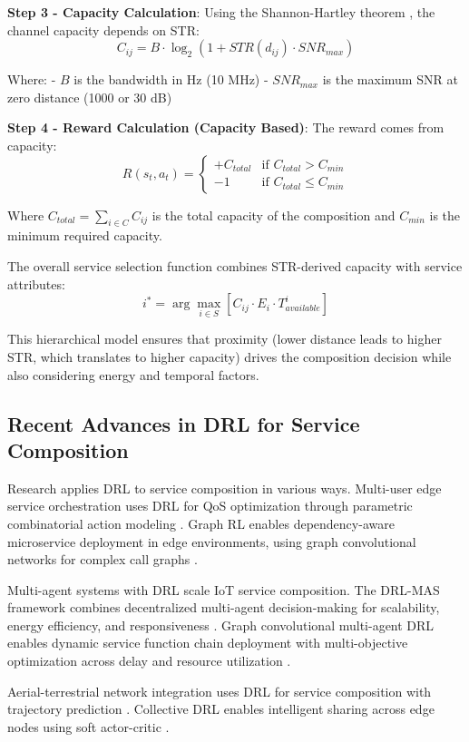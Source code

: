\documentclass[10pt,twocolumn]{article}
\begin{document}
\textbf{Step 3 - Capacity Calculation}: Using the Shannon-Hartley
theorem \nocite{shannon1948}, the channel capacity depends on STR:
\[C_{ij} = B \cdot \log_2(1 + STR(d_{ij}) \cdot SNR_{max})\]

Where: - \(B\) is the bandwidth in Hz (10 MHz) - \(SNR_{max}\) is the
maximum SNR at zero distance (1000 or 30 dB)

\textbf{Step 4 - Reward Calculation (Capacity Based)}: The reward comes
from capacity:
\[R(s_t, a_t) = \begin{cases} +C_{total} & \text{if } C_{total} > C_{min} \\ -1 & \text{if } C_{total} \leq C_{min} \end{cases}\]

Where \(C_{total} = \sum_{i \in C} C_{ij}\) is the total capacity of the
composition and \(C_{min}\) is the minimum required capacity.

The overall service selection function combines STR-derived capacity
with service attributes:
\[i^* = \arg\max_{i \in S} \left[ C_{ij} \cdot E_i \cdot T_{available}^i \right]\]

This hierarchical model ensures that proximity (lower distance leads to
higher STR, which translates to higher capacity) drives the composition
decision while also considering energy and temporal factors.

\subsection{Recent Advances in DRL for Service Composition}\label{recent-advances-in-drl-for-service-composition}

Research applies DRL to service composition in various ways. Multi-user
edge service orchestration uses DRL for QoS optimization through
parametric combinatorial action modeling \cite{liu2022}. Graph RL enables
dependency-aware microservice deployment in edge environments, using
graph convolutional networks for complex call graphs \cite{wang2024a}.

Multi-agent systems with DRL scale IoT service composition. The DRL-MAS
framework combines decentralized multi-agent decision-making for
scalability, energy efficiency, and responsiveness \cite{zhang2024a}. Graph
convolutional multi-agent DRL enables dynamic service function chain
deployment with multi-objective optimization across delay and resource
utilization \cite{liu2024b}.

Aerial-terrestrial network integration uses DRL for service composition
with trajectory prediction \cite{zhang2024b}. Collective DRL enables intelligent
sharing across edge nodes using soft actor-critic \cite{wang2025}.
\end{document}
